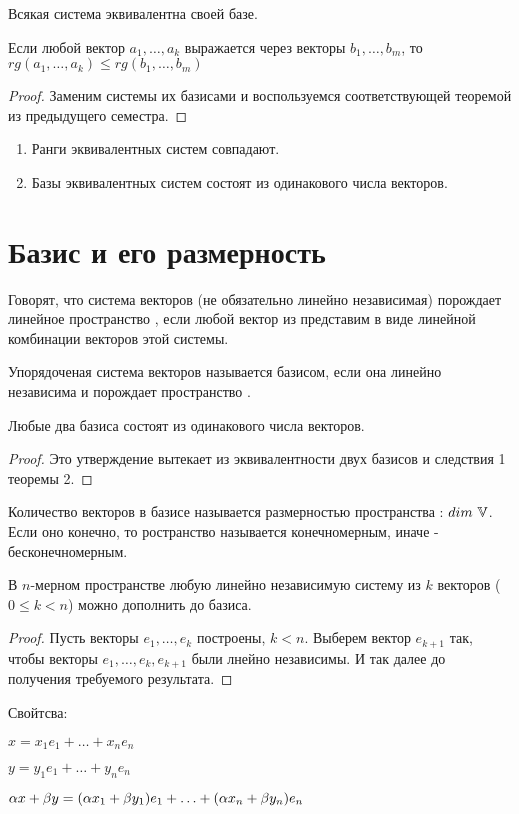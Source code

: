 \begin{effect}
Всякая система эквивалентна своей базе.
\end{effect}
\begin{theor}
Если любой вектор $a_1,\ldots,a_k$ выражается через векторы $b_1,\ldots,b_m$, то $rg(a_1,\ldots,a_k)\leq rg(b_1,\ldots,b_m)$
\end{theor}
\begin{proof}
Заменим системы их базисами и воспользуемся соответствующей теоремой из предыдущего семестра.
\end{proof}
\begin{effect}
\begin{enumerate}
\item Ранги эквивалентных систем совпадают.
\item Базы эквивалентных систем состоят из одинакового числа векторов.
\end{enumerate}
\end{effect}
\section{Базис и его размерность}
\begin{opred}
Говорят, что система векторов (не обязательно линейно независимая) порождает линейное пространство \V, если любой вектор из \V представим в виде линейной комбинации векторов этой системы.
\end{opred}
\begin{opred}
Упорядоченая система векторов называется базисом, если она линейно независима и порождает пространство \V.
\end{opred}
\begin{theor}
Любые два базиса состоят из одинакового числа векторов.
\end{theor}
\begin{proof}
Это утверждение вытекает из эквивалентности двух базисов и следствия 1 теоремы 2.
\end{proof}
\begin{opred}
Количество векторов в базисе называется размерностью пространства \V: $dim\ \mathbb{V}$. Если оно конечно, то ространство называется конечномерным, иначе - бесконечномерным.
\end{opred}
\begin{theor}
В $n$-мерном пространстве любую линейно независимую систему из $k$ векторов ($0\leq k<n$) можно дополнить до базиса.
\end{theor}
\begin{proof}
Пусть векторы $e_1,\ldots,e_k$ построены, $k<n$. Выберем вектор $e_{k+1}$ так, чтобы векторы $e_1,\ldots,e_k,e_{k+1}$ были лнейно независимы. И так далее до получения требуемого результата.
\end{proof}
Свойтсва:

$x=x_1e_1+\ldots+x_ne_n$

$y=y_1e_1+\ldots+y_ne_n$

$\alpha x+\beta y=(\alpha x_1+\beta y_1)e_1+\ldots+(\alpha x_n+\beta y_n)e_n$
